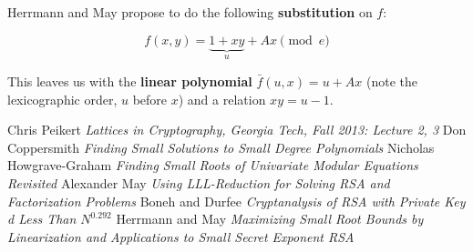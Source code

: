 \documentclass[a4paper,11pt]{article}
\begin{document}
Herrmann and May propose to do the following \textbf{substitution} on $f$:

\[ f(x,y)=\underbrace{1 + xy}_u + Ax \pmod{e} \]

This leaves us with the \textbf{linear polynomial} $\bar{f}(u, x) = u + Ax$ (note the lexicographic order, $u$ before $x$) and a relation $xy = u - 1$.



\newpage
\begin{thebibliography}{1}

 Chris Peikert {\em Lattices in Cryptography, Georgia Tech, Fall 2013: Lecture 2, 3}
 Don Coppersmith {\em Finding Small Solutions to Small Degree Polynomials}
 Nicholas Howgrave-Graham {\em Finding Small Roots of Univariate Modular Equations Revisited}
 Alexander May {\em Using LLL-Reduction for Solving RSA and Factorization Problems}
 Boneh and Durfee {\em Cryptanalysis of RSA with Private Key d Less Than $N^{0.292}$}
 Herrmann and May {\em Maximizing Small Root Bounds by Linearization and Applications to Small Secret Exponent RSA}


\end{thebibliography}
\end{document}

